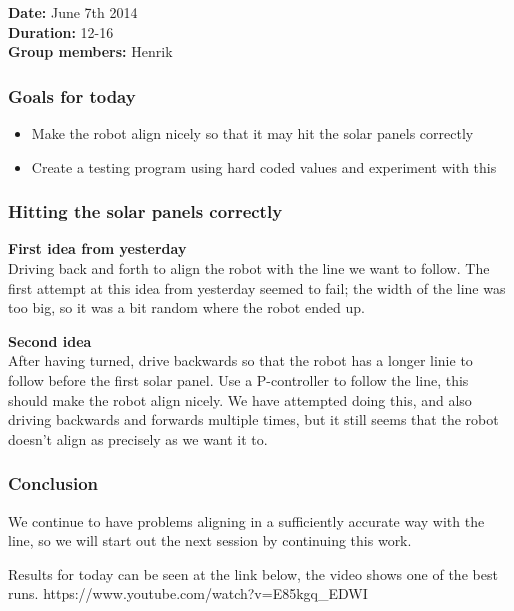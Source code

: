 \textbf{Date:} June 7th 2014\\\textbf{Duration:} 12-16\\\textbf{Group
members:} Henrik

\subsubsection{Goals for today}

\begin{itemize}
\itemsep1pt\parskip0pt
\item
  Make the robot align nicely so that it may hit the solar panels
  correctly
\item
  Create a testing program using hard coded values and experiment with
  this
\end{itemize}

\subsubsection{Hitting the solar panels correctly}

\textbf{First idea from yesterday}\\Driving back and forth to align the
robot with the line we want to follow. The first attempt at this idea
from yesterday seemed to fail; the width of the line was too big, so it
was a bit random where the robot ended up.

\textbf{Second idea}\\After having turned, drive backwards so that the
robot has a longer linie to follow before the first solar panel. Use a
P-controller to follow the line, this should make the robot align
nicely. We have attempted doing this, and also driving backwards and
forwards multiple times, but it still seems that the robot doesn't align
as precisely as we want it to.

\subsubsection{Conclusion}

We continue to have problems aligning in a sufficiently accurate way
with the line, so we will start out the next session by continuing this
work.

Results for today can be seen at the link below, the video shows one of
the best runs. https://www.youtube.com/watch?v=E85kgq\_EDWI
